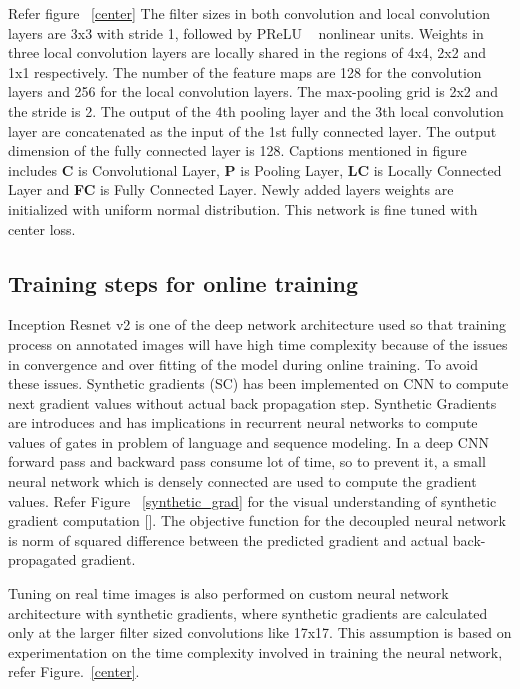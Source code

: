 \documentclass[a4paper,12pt, twoside]{NITKReport}
\begin{document}
\par Refer figure ~\ref{center} The filter sizes in both convolution and local convolution layers are 3x3 with stride 1, followed by PReLU ~\cite{DBLP:journals/corr/HeZR015} nonlinear units. Weights in three local convolution layers are locally shared in the regions of 4x4, 2x2 and 1x1 respectively. The number of the feature maps are 128 for the convolution layers and 256 for the local convolution layers. The max-pooling grid is 2x2 and the stride is 2. The output of the 4th pooling layer and the 3th local convolution layer are concatenated as the input of the 1st fully connected layer. The output dimension of the fully connected layer is 128. Captions mentioned in figure includes \textbf{C} is Convolutional Layer, \textbf{P} is Pooling Layer, \textbf{LC} is Locally Connected Layer and \textbf{FC} is Fully Connected Layer. Newly added layers weights are initialized with uniform normal distribution. This network is fine tuned with center loss. 

\subsection{Training steps for online training}
\par Inception Resnet v2 is one of the deep network architecture used so that training process on annotated images will have high time complexity because of the issues in convergence and over fitting of the model during online training. To avoid these issues. Synthetic gradients (SC) has been implemented on CNN to compute next gradient values without actual back propagation step. Synthetic Gradients are introduces and has implications in recurrent neural networks to compute values of gates in problem of language and sequence modeling.  In a deep CNN forward pass and backward pass consume lot of time, so to prevent it, a small neural network which is densely connected are used to compute the gradient values. Refer Figure ~\ref{synthetic_grad} for the visual understanding of synthetic gradient computation [\cite{DBLP:journals/corr/JaderbergCOVGK16}]. The objective function for the decoupled neural network is norm of squared difference between the predicted gradient and actual back-propagated gradient.

\par Tuning on real time images is also performed on custom neural network architecture with synthetic gradients, where synthetic gradients are calculated only at the larger filter sized convolutions like 17x17. This assumption is based on experimentation on the time complexity involved in training the neural network, refer Figure.~\ref{center}. 
\end{document}
